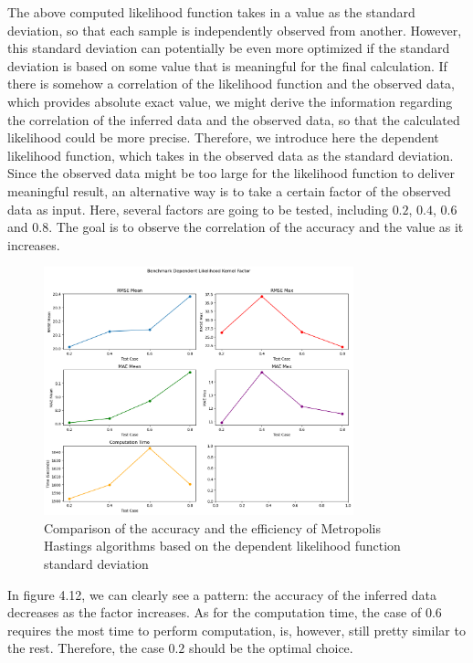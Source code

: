 The above computed likelihood function takes in a value as the standard deviation, so that each sample is independently observed from another. However, this standard deviation can potentially be even more optimized if the standard deviation is based on some value that is meaningful for the final calculation. If there is somehow a correlation of the likelihood function and the observed data, which provides absolute exact value, we might derive the information regarding the correlation of the inferred data and the observed data, so that the calculated likelihood could be more precise. Therefore, we introduce here the dependent likelihood function, which takes in the observed data as the standard deviation. Since the observed data might be too large for the likelihood function to deliver meaningful result, an alternative way is to take a certain factor of the observed data as input. Here, several factors are going to be tested, including $0.2$, $0.4$, $0.6$ and $0.8$. The goal is to observe the correlation of the accuracy and the value as it increases.

\begin{figure}
    \centering
    \includegraphics[width=0.8\textwidth]{figures/basic_mh/benchmark/sensitivity_likelihood_dependent.png}
    \captionsetup{width=.8\textwidth}
    \caption{Comparison of the accuracy and the efficiency of Metropolis Hastings algorithms based on the dependent likelihood function standard deviation}
    \label{fig:enter-label}
\end{figure}



In figure 4.12, we can clearly see a pattern: the accuracy of the inferred data decreases as the factor increases. As for the computation time, the case of $0.6$ requires the most time to perform computation, is, however, still pretty similar to the rest. Therefore, the case $0.2$ should be the optimal choice.

